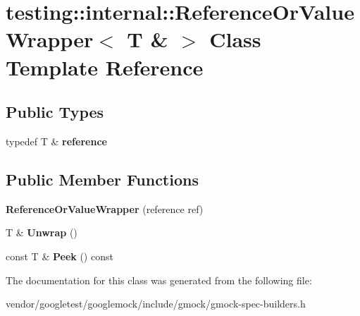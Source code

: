 \hypertarget{classtesting_1_1internal_1_1ReferenceOrValueWrapper_3_01T_01_6_01_4}{}\section{testing\+:\+:internal\+:\+:Reference\+Or\+Value\+Wrapper$<$ T \& $>$ Class Template Reference}
\label{classtesting_1_1internal_1_1ReferenceOrValueWrapper_3_01T_01_6_01_4}
\subsection*{Public Types}
\begin{DoxyCompactItemize}
\item 
typedef T \& {\bfseries reference}\hypertarget{classtesting_1_1internal_1_1ReferenceOrValueWrapper_3_01T_01_6_01_4_a62e7f6ebcf40daa08130ea52fd0215ee}{}\label{classtesting_1_1internal_1_1ReferenceOrValueWrapper_3_01T_01_6_01_4_a62e7f6ebcf40daa08130ea52fd0215ee}

\end{DoxyCompactItemize}
\subsection*{Public Member Functions}
\begin{DoxyCompactItemize}
\item 
{\bfseries Reference\+Or\+Value\+Wrapper} (reference ref)\hypertarget{classtesting_1_1internal_1_1ReferenceOrValueWrapper_3_01T_01_6_01_4_ad31b242ceae7f318096c78a798b33379}{}\label{classtesting_1_1internal_1_1ReferenceOrValueWrapper_3_01T_01_6_01_4_ad31b242ceae7f318096c78a798b33379}

\item 
T \& {\bfseries Unwrap} ()\hypertarget{classtesting_1_1internal_1_1ReferenceOrValueWrapper_3_01T_01_6_01_4_a0b95dd4e20f237aee89864507172706e}{}\label{classtesting_1_1internal_1_1ReferenceOrValueWrapper_3_01T_01_6_01_4_a0b95dd4e20f237aee89864507172706e}

\item 
const T \& {\bfseries Peek} () const \hypertarget{classtesting_1_1internal_1_1ReferenceOrValueWrapper_3_01T_01_6_01_4_ac60d6889405e793259fe409255df2299}{}\label{classtesting_1_1internal_1_1ReferenceOrValueWrapper_3_01T_01_6_01_4_ac60d6889405e793259fe409255df2299}

\end{DoxyCompactItemize}


The documentation for this class was generated from the following file\+:\begin{DoxyCompactItemize}
\item 
vendor/googletest/googlemock/include/gmock/gmock-\/spec-\/builders.\+h\end{DoxyCompactItemize}
